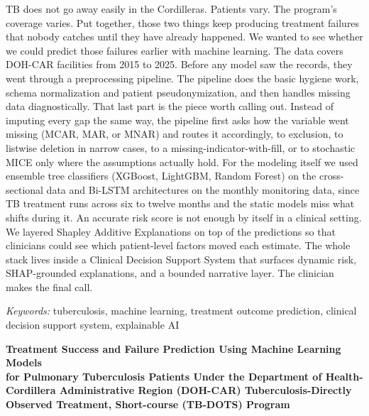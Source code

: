 \documentclass[12pt]{article}
\renewcommand{\_}{\textunderscore\allowbreak}
\begin{document}
{
\setlength{\parindent}{0pt}
TB does not go away easily in the Cordilleras. Patients vary. The program's coverage varies. Put together, those two things keep producing treatment failures that nobody catches until they have already happened. We wanted to see whether we could predict those failures earlier with machine learning. The data covers DOH-CAR facilities from 2015 to 2025. Before any model saw the records, they went through a preprocessing pipeline. The pipeline does the basic hygiene work, schema normalization and patient pseudonymization, and then handles missing data diagnostically. That last part is the piece worth calling out. Instead of imputing every gap the same way, the pipeline first asks how the variable went missing (MCAR, MAR, or MNAR) and routes it accordingly, to exclusion, to listwise deletion in narrow cases, to a missing-indicator-with-fill, or to stochastic MICE only where the assumptions actually hold. For the modeling itself we used ensemble tree classifiers (XGBoost, LightGBM, Random Forest) on the cross-sectional data and Bi-LSTM architectures on the monthly monitoring data, since TB treatment runs across six to twelve months and the static models miss what shifts during it. An accurate risk score is not enough by itself in a clinical setting. We layered Shapley Additive Explanations on top of the predictions so that clinicians could see which patient-level factors moved each estimate. The whole stack lives inside a Clinical Decision Support System that surfaces dynamic risk, SHAP-grounded explanations, and a bounded narrative layer. The clinician makes the final call.

\noindent\hspace*{0.5in}\textit{Keywords:} tuberculosis, machine learning, treatment outcome prediction, clinical decision support system, explainable AI
}

\newpage

\newpage
\begin{center}
{\bfseries Treatment Success and Failure Prediction Using Machine Learning Models\\
for Pulmonary Tuberculosis Patients Under the Department of Health-Cordillera Administrative Region (DOH-CAR) Tuberculosis-Directly Observed Treatment, Short-course (TB-DOTS) Program}
\end{center}
\end{document}
